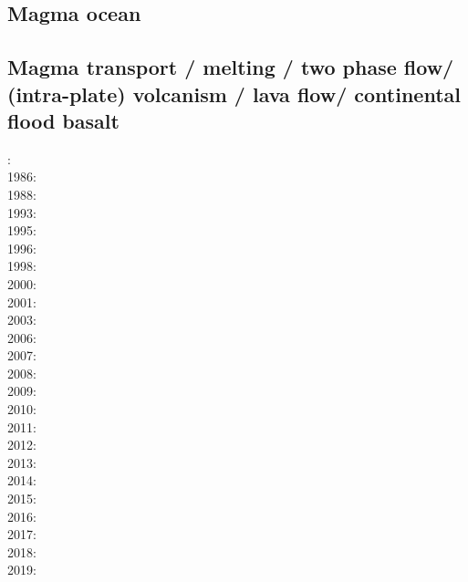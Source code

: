 \subsection*{Magma ocean}

\cite{maha15}



\subsection*{Magma transport / melting / two phase flow/ (intra-plate) volcanism / lava flow/ 
continental flood basalt}

: \cite{scst84}\cite{mcke84}\\
1986: \cite{scst86}\\
1988: \cite{scot88}\\
1993: \cite{spie93}\\
1995: \cite{bisc95}\\
1996: \cite{laki96}\\
1998: \cite{rabg98}\\
2000: \cite{elha00}\\
2001: \cite{bers01}\\
2003: \cite{beri03}\\
2006: \cite{onmm06}\\
2007: \cite{srrb07}\cite{mohb07}\cite{elki07}\cite{copb07}\\
2008: \cite{hets08}\cite{hest08}\\
2009: \cite{bavi09}\\
2010: \cite{baiv10}\cite{habl10}\cite{cows10}\\
2011: \cite{baiv11}\cite{zhgy11}\cite{zhgh11}\cite{bics11}\\
2012: \cite{yatd12}\cite{kasc12b}\\
2013: \cite{kemk13}\cite{mofm13}\\
2014: \cite{kast14}\\
2015: \cite{tukb15}\cite{moba15}\\
2016: \cite{keka16}\\
2017: \cite{dilc17}\\
2018: \cite{lorg18}\\
2019: \cite{dagg19}

